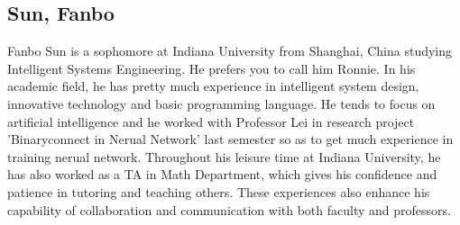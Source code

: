 
\subsection{Sun, Fanbo}

Fanbo Sun is a sophomore at Indiana University from Shanghai, China studying Intelligent Systems Engineering. 
He prefers you to call him Ronnie.  In his academic field, he has pretty much experience in intelligent system design, 
innovative technology and basic programming language. He tends to focus on artificial intelligence and he worked with 
Professor Lei in research project 'Binaryconnect in Nerual Network' last semester so as to get much experience in training 
nerual network.  Throughout his leisure time at Indiana University, he has also worked as a TA in Math Department, 
which gives his confidence and patience in tutoring and teaching others. These experiences also enhance his capability of 
collaboration and communication with both faculty and professors.
